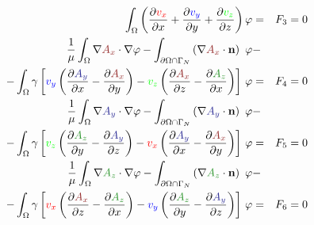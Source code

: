 \documentclass[smallextended]{svjour3}       %
\begin{document}
\begin{eqnarray}
			\int_{\Omega} \left(\frac{\partial \textcolor{red}{v_x}}{\partial x} + \frac{\partial \textcolor{blu}{v_y}}{\partial y} + \frac{\partial \textcolor{gre}{v_z}}{\partial z}\right) \varphi & = & F_3 = 0 \\
			\frac{1}{\mu}\int_{\Omega}\nabla \textcolor{darkred}{A_x} \cdot \nabla \varphi - \int_{\partial \Omega \cap \Gamma_{N}} \left(\nabla \textcolor{darkred}{A_x}\cdot \mathbf{n}\right)\ \varphi 
			 \nonumber& - \\
			-  \int_{\Omega} \gamma \left[\textcolor{blu}{v_y} \left(\frac{\partial \textcolor{darkblu}{A_y}}{\partial x} - \frac{\partial \textcolor{darkred}{A_x}}{\partial y}\right) - \textcolor{gre}{v_z} \left(\frac{\partial \textcolor{darkred}{A_x}}{\partial z} - \frac{\partial \textcolor{darkgre}{A_z}}{\partial x}\right)\right]\,\varphi & = & F_4 = 0 \\			
			\frac{1}{\mu}\int_{\Omega}\nabla \textcolor{darkblu}{A_y} \cdot \nabla \varphi - \int_{\partial \Omega \cap \Gamma_{N}} \left(\nabla \textcolor{darkblu}{A_y}\cdot \mathbf{n}\right)\ \varphi 
			 \nonumber& - \\
			- \int_{\Omega} \gamma \left[\textcolor{gre}{v_z} \left(\frac{\partial \textcolor{darkgre}{A_z}}{\partial y} - \frac{\partial \textcolor{darkblu}{A_y}}{\partial z}\right) - \textcolor{red}{v_x} \left(\frac{\partial \textcolor{darkblu}{A_y}}{\partial x} - \frac{\partial \textcolor{darkred}{A_x}}{\partial y}\right)\right]\,\varphi & = & F_5 = 0 \\			
			\frac{1}{\mu}\int_{\Omega}\nabla \textcolor{darkgre}{A_z} \cdot \nabla \varphi - \int_{\partial \Omega \cap \Gamma_{N}} \left(\nabla \textcolor{darkgre}{A_z}\cdot \mathbf{n}\right)\ \varphi 
			 \nonumber& - \\
			-  \int_{\Omega} \gamma \left[\textcolor{red}{v_x} \left(\frac{\partial \textcolor{darkred}{A_x}}{\partial z} - \frac{\partial \textcolor{darkgre}{A_z}}{\partial x}\right) - \textcolor{blu}{v_y} \left(\frac{\partial \textcolor{darkgre}{A_z}}{\partial y} - \frac{\partial \textcolor{darkblu}{A_y}}{\partial z}\right)\right]\,\varphi & = & F_6 = 0 \\
			 \nonumber 
		\end{eqnarray}
		
\end{document}
